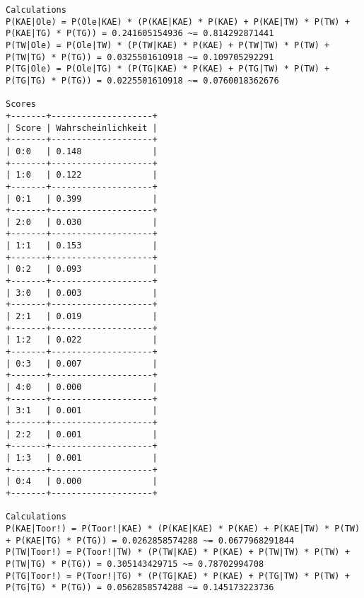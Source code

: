 \documentclass[a4paper]{article}
\begin{document}
\begin{lstlisting}
Calculations
P(KAE|Ole) = P(Ole|KAE) * (P(KAE|KAE) * P(KAE) + P(KAE|TW) * P(TW) + P(KAE|TG) * P(TG)) = 0.241605154936 ~= 0.814292871441
P(TW|Ole) = P(Ole|TW) * (P(TW|KAE) * P(KAE) + P(TW|TW) * P(TW) + P(TW|TG) * P(TG)) = 0.0325501610918 ~= 0.109705292291
P(TG|Ole) = P(Ole|TG) * (P(TG|KAE) * P(KAE) + P(TG|TW) * P(TW) + P(TG|TG) * P(TG)) = 0.0225501610918 ~= 0.0760018362676

Scores
+-------+--------------------+
| Score | Wahrscheinlichkeit |
+-------+--------------------+
| 0:0   | 0.148              |
+-------+--------------------+
| 1:0   | 0.122              |
+-------+--------------------+
| 0:1   | 0.399              |
+-------+--------------------+
| 2:0   | 0.030              |
+-------+--------------------+
| 1:1   | 0.153              |
+-------+--------------------+
| 0:2   | 0.093              |
+-------+--------------------+
| 3:0   | 0.003              |
+-------+--------------------+
| 2:1   | 0.019              |
+-------+--------------------+
| 1:2   | 0.022              |
+-------+--------------------+
| 0:3   | 0.007              |
+-------+--------------------+
| 4:0   | 0.000              |
+-------+--------------------+
| 3:1   | 0.001              |
+-------+--------------------+
| 2:2   | 0.001              |
+-------+--------------------+
| 1:3   | 0.001              |
+-------+--------------------+
| 0:4   | 0.000              |
+-------+--------------------+

Calculations
P(KAE|Toor!) = P(Toor!|KAE) * (P(KAE|KAE) * P(KAE) + P(KAE|TW) * P(TW) + P(KAE|TG) * P(TG)) = 0.0262858574288 ~= 0.0677968291844
P(TW|Toor!) = P(Toor!|TW) * (P(TW|KAE) * P(KAE) + P(TW|TW) * P(TW) + P(TW|TG) * P(TG)) = 0.305143429715 ~= 0.78702994708
P(TG|Toor!) = P(Toor!|TG) * (P(TG|KAE) * P(KAE) + P(TG|TW) * P(TW) + P(TG|TG) * P(TG)) = 0.0562858574288 ~= 0.145173223736


\end{lstlisting}
\end{document}

